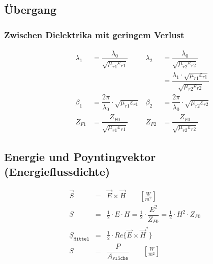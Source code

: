 \subsection{Übergang}
\subsubsection{Zwischen Dielektrika mit geringem Verlust}


\begin{align*}
    \quad \qquad \lambda_1 & = \dfrac{\lambda_0}{\sqrt{\mu_{r1}\varepsilon_{r1}}}          & \lambda_2 & = \dfrac{\lambda_0}{\sqrt{\mu_{r2}\varepsilon_{r2}}}                                     \\
    \quad \qquad           &                                                               &           & = \dfrac{\lambda_1\cdot\sqrt{\mu_{r1}\varepsilon_{r1}}}{\sqrt{\mu_{r2}\varepsilon_{r2}}} \\
    \quad \qquad \beta_1   & = \dfrac{2\pi}{\lambda_0}\cdot\sqrt{\mu_{r1}\varepsilon_{r1}} & \beta_2   & = \dfrac{2\pi}{\lambda_0}\cdot\sqrt{\mu_{r2}\varepsilon_{r2}}                            \\
    \quad \qquad Z_{F1}    & = \dfrac{Z_{F0}}{\sqrt{\mu_{r1}\varepsilon_{r1}}}             & Z_{F2}    & = \dfrac{Z_{F0}}{\sqrt{\mu_{r2}\varepsilon_{r2}}}
\end{align*}

\subsection{Energie und Poyntingvektor (Energieflussdichte)}
\begin{align*}
     & \vec{S}                         & = & \vec{E}\times\vec{H} \qquad \si{\left[\frac{W}{m^2}\right]}                                              \\
     & S                               & = & \frac{1}{2} \cdot E \cdot H = \frac{1}{2} \cdot \dfrac{E^2}{Z_{F0}} = \frac{1}{2} \cdot H^2 \cdot Z_{F0} \\
     & \underline{S}_{\texttt{Mittel}} & = & \frac{1}{2} \cdot Re\{\vec{E}\times\vec{H}^*\}                                                           \\
     & S                               & = & \dfrac{P}{A_\texttt{Fläche}} \qquad \si{\left[\frac{W}{m^2}\right]}                                      \\
\end{align*}

